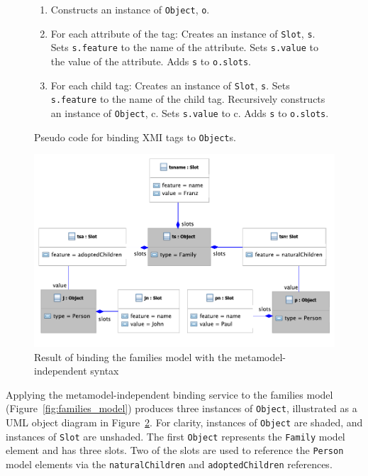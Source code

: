 \begin{figure}[p]
	\begin{framed}
		\begin{enumerate}
			\item Constructs an instance of \texttt{Ob\-je\-ct}, \texttt{o}.
			\item For each attribute of the tag:
			\subitem Creates an instance of \texttt{Sl\-ot}, \texttt{s}.
			\subitem Sets \texttt{s.feature} to the name of the attribute.
			\subitem Sets \texttt{s.value} to the value of the attribute.
			\subitem Adds \texttt{s} to \texttt{o.slots}.
			\item For each child tag:
			\subitem Creates an instance of \texttt{Sl\-ot}, \texttt{s}.
			\subitem Sets \texttt{s.feature} to the name of the child tag.
			\subitem Recursively constructs an instance of \texttt{Ob\-je\-ct}, c.
			\subitem Sets \texttt{s.value} to c.
			\subitem Adds \texttt{s} to \texttt{o.slots}.
		\end{enumerate}
	\end{framed}
	\caption{Pseudo code for binding XMI tags to \texttt{Ob\-je\-ct}s.}
  \label{fig:binding_objects}
\end{figure}

\begin{figure}[p]
  \centering
  \includegraphics[width=12cm]{5.Implementation/images/generic_binding.pdf}
  \caption{Result of binding the families model with the metamodel-independent syntax}
  \label{fig:generic_binding}
\end{figure}

Applying the metamodel-independent binding service to the families model (Figure~\ref{fig:families_model}) produces three instances of \texttt{Ob\-je\-ct}, illustrated as a UML object diagram in Figure~\ref{fig:generic_binding}. For clarity, instances of \texttt{Ob\-je\-ct} are shaded, and instances of \texttt{Sl\-ot} are unshaded. The first \texttt{Ob\-je\-ct} represents the \texttt{Fa\-mi\-ly} model element and has three slots. Two of the slots are used to reference the \texttt{Pe\-rs\-on} model elements via the \texttt{na\-tu\-r\-alCh\-il\-dr\-en} and \texttt{ad\-op\-t\-edCh\-il\-dr\-en} references. 


